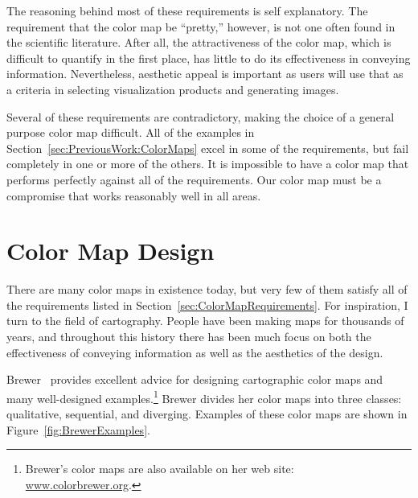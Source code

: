 \documentclass{acmsiggraph}               %
\newcommand{\scite}[1]{~\shortcite{#1}}
\begin{document}
The reasoning behind most of these requirements is self explanatory.  The
requirement that the color map be ``pretty,'' however, is not one often
found in the scientific literature.  After all, the attractiveness of the
color map, which is difficult to quantify in the first place, has little to
do its effectiveness in conveying information.  Nevertheless, aesthetic
appeal is important as users will use that as a criteria in selecting
visualization products and generating images.


Several of these requirements are contradictory, making the choice of a
general purpose color map difficult.  All of the examples in
Section~\ref{sec:PreviousWork:ColorMaps} excel in some of the requirements,
but fail completely in one or more of the others.  It is impossible to have
a color map that performs perfectly against all of the requirements.  Our color
map must be a compromise that works reasonably well in all areas.


\section{Color Map Design}
\label{sec:ColorMapDesign}

There are many color maps in existence today, but very few of them satisfy
all of the requirements listed in Section~\ref{sec:ColorMapRequirements}.
For inspiration, I turn to the field of cartography.  People
have been making maps for thousands of years, and throughout this history
there has been much focus on both the effectiveness of
conveying information as well as the aesthetics of the design.

Brewer\scite{Brewer05} provides excellent advice for designing cartographic
color maps and many well-designed examples.\footnote{Brewer's color maps
are also available on her web site:
\href{http://www.colorbrewer.org}{www.colorbrewer.org}.} Brewer divides her
color maps into three classes: qualitative, sequential, and diverging.
Examples of these color maps are shown in Figure~\ref{fig:BrewerExamples}.
\end{document}
